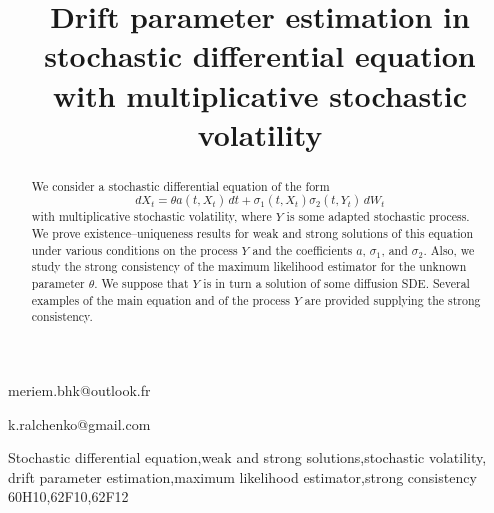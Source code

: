 \documentclass[numbers,compress,v1.0.1]{vmsta}
\theoremstyle{remark}
\begin{document}
%
\begin{frontmatter}

\title{Drift parameter estimation in stochastic differential equation
with multiplicative stochastic volatility}
%
%
%

\author[a]{}\email
{meriem.bhk@outlook.fr}
\author[b]{}
\author[b]{}\email
{k.ralchenko@gmail.com}
\author[a]{}

\address[a]{University of Monastir, Faculty of Sciences of Monastir,
Department of Mathematics, Avenue de l'Environnement, 5000, Monastir, Tunisia}
\address[b]{Department of Probability Theory,
Statistics and Actuarial Mathematics,\\
Taras Shevchenko National University of Kyiv,\\
64 Volodymyrska, 01601 Kyiv, Ukraine}


\begin{abstract}
We consider a stochastic differential equation of the form
%
\[
dX_t = \theta a(t,X_t)\,dt + \sigma_1(t,X_t)
\sigma_2(t,Y_t)\,dW_t
\]
%
with multiplicative stochastic volatility, where $Y$ is some adapted
stochastic process.
We prove existence--uniqueness results for weak and strong solutions of
this equation under various conditions on the process $Y$ and the
coefficients $a$, $\sigma_1$, and $\sigma_2$.
Also, we study the strong consistency of the maximum likelihood
estimator for the unknown parameter $\theta$. We suppose that $Y$ is in
turn a solution of some diffusion SDE. Several examples of the main
equation and of the process $Y$ are provided supplying the strong consistency.
\end{abstract}

\begin{keyword}
Stochastic differential equation\sep weak and
strong solutions\sep stochastic volatility\sep
drift parameter estimation\sep maximum likelihood
estimator\sep strong consistency
\MSC[2010] 60H10\sep62F10\sep62F12
\end{keyword}


%
%
%
\end{frontmatter}
\end{document}
